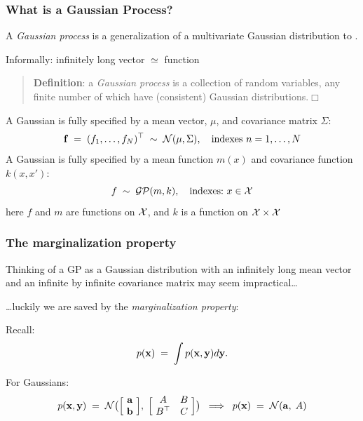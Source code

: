 \begin{frame}
\frametitle{What is a Gaussian Process?}

A \emph{Gaussian process} is a generalization of a multivariate Gaussian
distribution to .

Informally: infinitely long vector $\simeq$ function

\begin{quote}
{\bf Definition}: a \emph{Gaussian process} is a collection of random
variables, any finite number of which have (consistent) Gaussian
distributions.\hfill$\Box$
\end{quote}

A Gaussian  is fully specified by a mean vector, $\mu$, and
covariance matrix $\Sigma$:
\[
\mathbf f\;=\;(f_1,\ldots,f_N)^\top\;\sim\;{\cal N}(\mu,\Sigma),
\text{\ \ \ indexes\ } n=1,\ldots,N
\]
A Gaussian  is fully specified by a mean function $m(x)$ and
covariance function $k(x,x')$:
\[
f\;\sim\;{\cal GP}(m,k), \text{\ \ \ indexes:\ }x \in
{\cal X}
\]
here $f$ and $m$ are functions on ${\cal X}$, and $k$ is a function on
${\cal X} \times {\cal X}$
\end{frame}


\begin{frame}
\frametitle{The marginalization property}

Thinking of a GP as a Gaussian distribution with an infinitely long mean vector
and an infinite by infinite covariance matrix may seem impractical\ldots

\ldots luckily we are saved by the \emph{marginalization property}:

Recall:
\[
p(\mathbf x)\;=\;\int p(\mathbf x,\mathbf y)d\mathbf y.
\]

For Gaussians:
\[
p(\mathbf x,\mathbf y)\;=\;{\cal N}\big(\Big[\!\begin{array}{c}{\bf a} \\ {\bf b}
\end{array}\!\Big],
\;\Big[\!\begin{array}{cc}A & B \\ B^\top & C\end{array}\!\Big]\big)
\;\;\Longrightarrow\;\;p(\mathbf x)\;=\;{\cal N}({\bf a},\;A)
\]
\end{frame}


